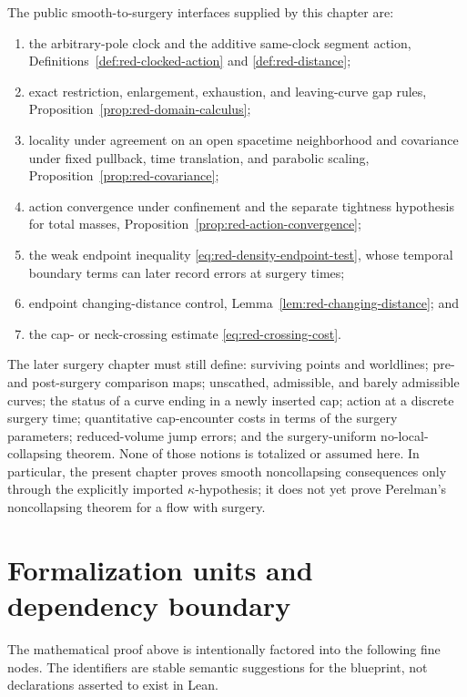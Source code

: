 \documentclass[10pt]{coll-l}
\theoremstyle{definition}
\theoremstyle{remark}
\numberwithin{section}{chapter}
\numberwithin{equation}{chapter}
\begin{document}
The public smooth-to-surgery interfaces supplied by this chapter are:
\begin{enumerate}
\item the arbitrary-pole clock and the additive same-clock segment action,
      Definitions~\ref{def:red-clocked-action} and \ref{def:red-distance};
\item exact restriction, enlargement, exhaustion, and leaving-curve gap
      rules, Proposition~\ref{prop:red-domain-calculus};
\item locality under agreement on an open spacetime neighborhood and
      covariance under fixed pullback, time translation, and parabolic
      scaling, Proposition~\ref{prop:red-covariance};
\item action convergence under confinement and the separate tightness
      hypothesis for total masses, Proposition~\ref{prop:red-action-convergence};
\item the weak endpoint inequality
      \eqref{eq:red-density-endpoint-test}, whose temporal boundary terms
      can later record errors at surgery times;
\item endpoint changing-distance control,
      Lemma~\ref{lem:red-changing-distance}; and
\item the cap- or neck-crossing estimate
      \eqref{eq:red-crossing-cost}.
\end{enumerate}

The later surgery chapter must still define: surviving points and
worldlines; pre- and post-surgery comparison maps; unscathed, admissible, and
barely admissible curves; the status of a curve ending in a newly inserted
cap; action at a discrete surgery time; quantitative cap-encounter costs in
terms of the surgery parameters; reduced-volume jump errors; and the
surgery-uniform no-local-collapsing theorem.  None of those notions is
totalized or assumed here.  In particular, the present chapter proves smooth
noncollapsing consequences only through the explicitly imported
$\kappa$-hypothesis; it does not yet prove Perelman's noncollapsing theorem
for a flow with surgery.

\section{Formalization units and dependency boundary}
\label{sec:red-formalization}

The mathematical proof above is intentionally factored into the following
fine nodes.  The identifiers are stable semantic suggestions for the
blueprint, not declarations asserted to exist in Lean.
\end{document}

